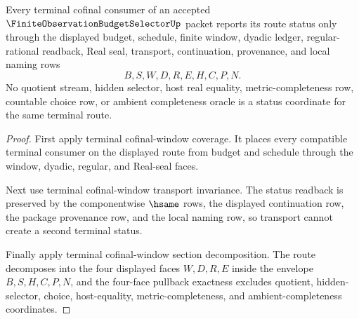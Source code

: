 \begin{theorem}
\label{thm:finite-observation-budget-selector-terminal-route-status-readback}
Every terminal cofinal consumer of an accepted $\FiniteObservationBudgetSelectorUp$ packet reports its route status only through the displayed budget, schedule, finite window, dyadic ledger, regular-rational readback, Real seal, transport, continuation, provenance, and local naming rows
$$
B,S,W,D,R,E,H,C,P,N.
$$
No quotient stream, hidden selector, host real equality, metric-completeness row, countable choice row, or ambient completeness oracle is a status coordinate for the same terminal route.
\end{theorem}
\begin{proof}
First apply terminal cofinal-window coverage. It places every compatible terminal consumer on the displayed route from budget and schedule through the window, dyadic, regular, and Real-seal faces.

Next use terminal cofinal-window transport invariance. The status readback is preserved by the componentwise $\hsame$ rows, the displayed continuation row, the package provenance row, and the local naming row, so transport cannot create a second terminal status.

Finally apply terminal cofinal-window section decomposition. The route decomposes into the four displayed faces $W,D,R,E$ inside the envelope $B,S,H,C,P,N$, and the four-face pullback exactness excludes quotient, hidden-selector, choice, host-equality, metric-completeness, and ambient-completeness coordinates.
\end{proof}

